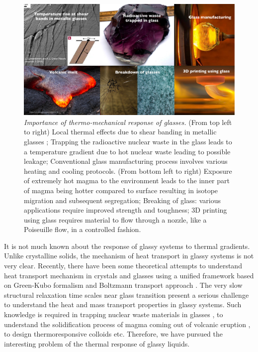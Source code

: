     \begin{figure}[hbt!]
	\includegraphics[width=14cm]{figs/thermoMechanical.pdf}
	\centering
	\caption[{\em Importance of thermo-mechanical response of glasses: some examples.}]{{\em Importance of thermo-mechanical response of glasses.} (From top left to right) Local thermal effects due to shear banding in metallic glasses  \cite{lewandowski2006temperature}; Trapping the radioactive nuclear waste in the glass leads to a temperature gradient due to hot nuclear waste leading to possible leakage; Conventional glass manufacturing process involves various heating and cooling protocols. (From bottom left to right) Exposure of extremely hot magma to the environment leads to the inner part of magma being hotter compared to surface resulting in isotope migration and subsequent segregation; Breaking of glass: various applications require improved strength and toughness; 3D printing using glass requires material to flow through a nozzle, like a Poiseuille flow, in a controlled fashion. \label{fig_thermoMechanical}}
    \end{figure}


It is not much known about the response of glassy systems to thermal gradients. Unlike crystalline solids, the mechanism of heat transport in glassy systems is not very clear. Recently, there have been some theoretical attempts to understand heat transport mechanism in crystals and glasses using a unified framework based on Green-Kubo formalism and Boltzmann transport approach \cite{isaeva2019modeling,fiorentino2022green}. The very slow structural relaxation time scales near glass transition present a serious challenge to understand the heat and mass transport properties in glassy systems. Such knowledge is required in trapping nuclear waste materials in glasses \cite{longhurst1985soret,guy1992modelling}, to understand the solidification process of magma coming out of volcanic eruption \cite{koehler2016,dominguez2011soret}, to design thermoresponsive colloids \cite{koniger2013thermophoresis} etc. Therefore, we have pursued the interesting problem of the thermal response of glassy liquids.

